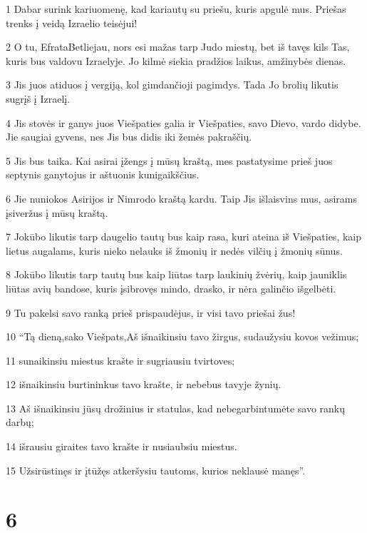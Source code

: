 \par 1 Dabar surink kariuomenę, kad kariautų su priešu, kuris apgulė mus. Priešas trenks į veidą Izraelio teisėjui! 
\par 2 O tu, Efrata­Betliejau, nors esi mažas tarp Judo miestų, bet iš tavęs kils Tas, kuris bus valdovu Izraelyje. Jo kilmė siekia pradžios laikus, amžinybės dienas. 
\par 3 Jis juos atiduos į vergiją, kol gimdančioji pagimdys. Tada Jo brolių likutis sugrįš į Izraelį. 
\par 4 Jis stovės ir ganys juos Viešpaties galia ir Viešpaties, savo Dievo, vardo didybe. Jie saugiai gyvens, nes Jis bus didis iki žemės pakraščių. 
\par 5 Jis bus taika. Kai asirai įžengs į mūsų kraštą, mes pastatysime prieš juos septynis ganytojus ir aštuonis kunigaikščius. 
\par 6 Jie nuniokos Asirijos ir Nimrodo kraštą kardu. Taip Jis išlaisvins mus, asirams įsiveržus į mūsų kraštą. 
\par 7 Jokūbo likutis tarp daugelio tautų bus kaip rasa, kuri ateina iš Viešpaties, kaip lietus augalams, kuris nieko nelauks iš žmonių ir nedės vilčių į žmonių sūnus. 
\par 8 Jokūbo likutis tarp tautų bus kaip liūtas tarp laukinių žvėrių, kaip jauniklis liūtas avių bandose, kuris įsibrovęs mindo, drasko, ir nėra galinčio išgelbėti. 
\par 9 Tu pakelsi savo ranką prieš prispaudėjus, ir visi tavo priešai žus! 
\par 10 “Tą dieną,­sako Viešpats,­Aš išnaikinsiu tavo žirgus, sudaužysiu kovos vežimus; 
\par 11 sunaikinsiu miestus krašte ir sugriausiu tvirtoves; 
\par 12 išnaikinsiu burtininkus tavo krašte, ir nebebus tavyje žynių. 
\par 13 Aš išnaikinsiu jūsų drožinius ir statulas, kad nebegarbintumėte savo rankų darbų; 
\par 14 išrausiu giraites tavo krašte ir nusiaubsiu miestus. 
\par 15 Užsirūstinęs ir įtūžęs atkeršysiu tautoms, kurios neklausė manęs”.



\chapter{6}


